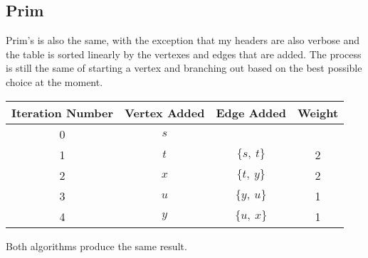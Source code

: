 \documentclass{article}
\begin{document}
\subsection{Prim}
Prim's is also the same, with the exception that my headers are also verbose and the table is sorted linearly by the vertexes and edges that are added. The process is still the same of starting a vertex and branching out based on the best possible choice at the moment.

\begin{center}
\begin{tabular}{c|c|c|c}
    \toprule
    \textbf{Iteration Number} & \textbf{Vertex Added} & \textbf{Edge Added} & \textbf{Weight} \\ \hline
    0 & $s$ &              &   \\
    1 & $t$ & $\{s, \ t\}$ & 2 \\
    2 & $x$ & $\{t, \ y\}$ & 2 \\
    3 & $u$ & $\{y, \ u\}$ & 1 \\
    4 & $y$ & $\{u, \ x\}$ & 1 \\
    \bottomrule
\end{tabular}
\end{center}

Both algorithms produce the same result.
\end{document}
